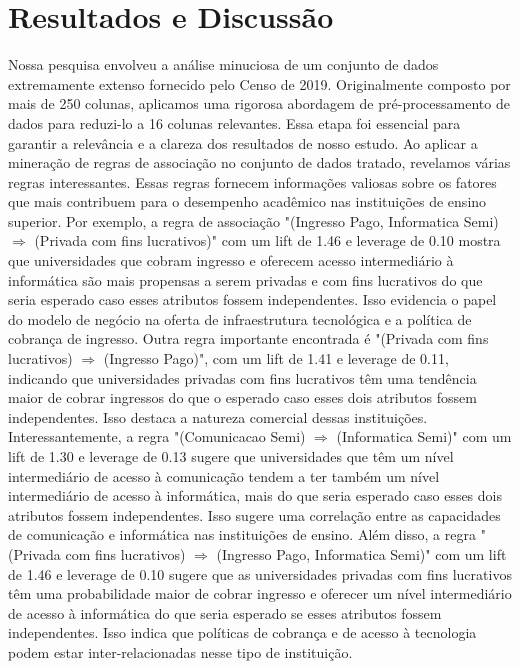 \documentclass[conference]{IEEEtran}
\begin{document}
\section{Resultados e Discussão}
Nossa pesquisa envolveu a análise minuciosa de um conjunto de dados extremamente extenso fornecido pelo Censo de 2019. Originalmente composto por mais de 250 colunas, aplicamos uma rigorosa abordagem de pré-processamento de dados para reduzi-lo a 16 colunas relevantes. Essa etapa foi essencial para garantir a relevância e a clareza dos resultados de nosso estudo.
Ao aplicar a mineração de regras de associação no conjunto de dados tratado, revelamos várias regras interessantes. Essas regras fornecem informações valiosas sobre os fatores que mais contribuem para o desempenho acadêmico nas instituições de ensino superior.
Por exemplo, a regra de associação "(Ingresso Pago, Informatica Semi) $\Rightarrow$ (Privada com fins lucrativos)" com um lift de 1.46 e leverage de 0.10 mostra que universidades que cobram ingresso e oferecem acesso intermediário à informática são mais propensas a serem privadas e com fins lucrativos do que seria esperado caso esses atributos fossem independentes. Isso evidencia o papel do modelo de negócio na oferta de infraestrutura tecnológica e a política de cobrança de ingresso.
Outra regra importante encontrada é "(Privada com fins lucrativos) $\Rightarrow$ (Ingresso Pago)", com um lift de 1.41 e leverage de 0.11, indicando que universidades privadas com fins lucrativos têm uma tendência maior de cobrar ingressos do que o esperado caso esses dois atributos fossem independentes. Isso destaca a natureza comercial dessas instituições.
Interessantemente, a regra "(Comunicacao Semi) $\Rightarrow$ (Informatica Semi)" com um lift de 1.30 e leverage de 0.13 sugere que universidades que têm um nível intermediário de acesso à comunicação tendem a ter também um nível intermediário de acesso à informática, mais do que seria esperado caso esses dois atributos fossem independentes. Isso sugere uma correlação entre as capacidades de comunicação e informática nas instituições de ensino.
Além disso, a regra "(Privada com fins lucrativos) $\Rightarrow$ (Ingresso Pago, Informatica Semi)" com um lift de 1.46 e leverage de 0.10 sugere que as universidades privadas com fins lucrativos têm uma probabilidade maior de cobrar ingresso e oferecer um nível intermediário de acesso à informática do que seria esperado se esses atributos fossem independentes. Isso indica que políticas de cobrança e de acesso à tecnologia podem estar inter-relacionadas nesse tipo de instituição.
\end{document}
